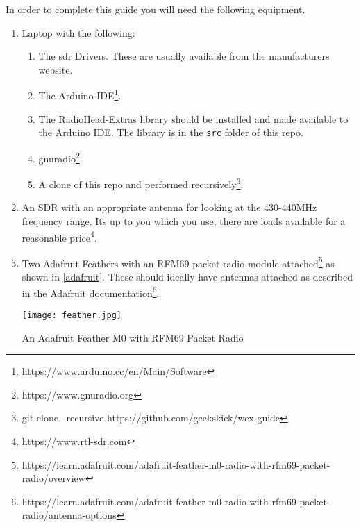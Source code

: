 In order to complete this guide you will need the following equipment.

\begin{enumerate}
\item Laptop with the following: 
\begin{enumerate}
\item The \gls{sdr} Drivers. These are usually available from the manufacturers website.
\item The Arduino IDE\footnote{https://www.arduino.cc/en/Main/Software}.
\item The RadioHead-Extras library should be installed and made available to the Arduino IDE. The library is in the \verb|src| folder of this repo.
\item gnuradio\footnote{https://www.gnuradio.org}.
\item A clone of this repo and performed recursively\footnote{git clone --recursive https://github.com/geekskick/wex-guide}.
\end{enumerate}
\item An SDR with an appropriate antenna for looking at the 430-440MHz frequency range. Its up to you which you use, there are loads available for a reasonable price\footnote{https://www.rtl-sdr.com}.
\item Two Adafruit Feathers with an RFM69 packet radio module attached\footnote{https://learn.adafruit.com/adafruit-feather-m0-radio-with-rfm69-packet-radio/overview} as shown in \cref{adafruit}. These should ideally have antennas attached as described in the Adafruit documentation\footnote{https://learn.adafruit.com/adafruit-feather-m0-radio-with-rfm69-packet-radio/antenna-options}. 

\centrefigurestart
\texttt{[image: feather.jpg]}
\caption{An Adafruit Feather M0 with RFM69 Packet Radio}
\label{adafruit}
\centrefigureend

\end{enumerate}
